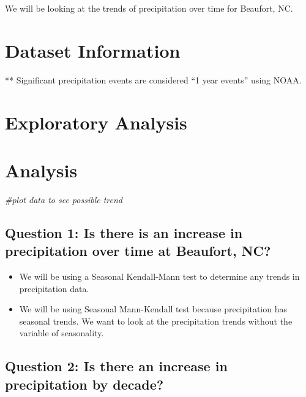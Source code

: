 \documentclass[
  12pt,
]{article}
\newenvironment{Shaded}{\begin{snugshade}}{\end{snugshade}}
\newcommand{\CommentTok}[1]{\textcolor[rgb]{0.56,0.35,0.01}{\textit{#1}}}
\providecommand{\tightlist}{%
  \setlength{\itemsep}{0pt}\setlength{\parskip}{0pt}}
\begin{document}
We will be looking at the trends of precipitation over time for
Beaufort, NC.

\newpage

\hypertarget{dataset-information}{%
\section{Dataset Information}\label{dataset-information}}

** Significant precipitation events are considered ``1 year events''
using NOAA.

\newpage

\hypertarget{exploratory-analysis}{%
\section{Exploratory Analysis}\label{exploratory-analysis}}

\newpage

\hypertarget{analysis}{%
\section{Analysis}\label{analysis}}

\begin{Shaded}
\begin{Highlighting}[]
\CommentTok{\#plot data to see possible trend}
\end{Highlighting}
\end{Shaded}

\hypertarget{question-1-is-there-is-an-increase-in-precipitation-over-time-at-beaufort-nc}{%
\subsection{Question 1: Is there is an increase in precipitation over
time at Beaufort,
NC?}\label{question-1-is-there-is-an-increase-in-precipitation-over-time-at-beaufort-nc}}

\begin{itemize}
\tightlist
\item
  We will be using a Seasonal Kendall-Mann test to determine any trends
  in precipitation data.
\item
  We will be using Seasonal Mann-Kendall test because precipitation has
  seasonal trends. We want to look at the precipitation trends without
  the variable of seasonality.
\end{itemize}

\hypertarget{question-2-is-there-an-increase-in-precipitation-by-decade}{%
\subsection{Question 2: Is there an increase in precipitation by
decade?}\label{question-2-is-there-an-increase-in-precipitation-by-decade}}
\end{document}
